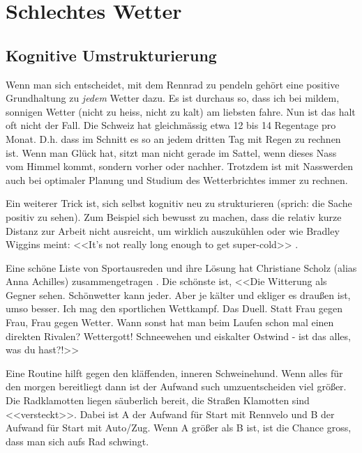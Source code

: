 \chapter{Schlechtes Wetter}


\section{Kognitive Umstrukturierung}

Wenn man sich entscheidet, mit dem Rennrad zu pendeln
gehört eine positive Grundhaltung zu \emph{jedem} Wetter dazu.
Es ist durchaus so, dass ich bei mildem, sonnigen Wetter
(nicht zu heiss, nicht zu kalt) am liebsten fahre.
Nun ist das halt oft nicht der Fall.
Die Schweiz hat gleichmässig etwa 12 bis 14 Regentage pro Monat.
D.h. dass im Schnitt es so an jedem dritten Tag mit Regen zu rechnen ist.
Wenn man Glück hat, sitzt man nicht gerade im Sattel,
wenn dieses Nass vom Himmel kommt, sondern vorher oder nachher.
Trotzdem ist mit Nasswerden auch bei optimaler Planung und Studium
des Wetterbrichtes immer zu rechnen.

Ein weiterer Trick ist, sich selbst kognitiv neu zu strukturieren
(sprich: die Sache positiv zu sehen).
Zum Beispiel sich bewusst zu machen, dass die relativ kurze Distanz zur Arbeit nicht ausreicht, 
um wirklich auszukühlen oder wie Bradley Wiggins meint:
<<It's not really long enough to get super-cold>> \cite{bbc2015wigginswinter}.

Eine schöne Liste von Sportausreden und ihre Lösung hat Christiane Scholz (alias Anna Achilles)
zusammengetragen \cite{Scholz2016Sportausreden}.
Die schönste ist, <<Die Witterung als Gegner sehen. Schönwetter kann jeder.
Aber je kälter und ekliger es draußen ist, umso besser.
Ich mag den sportlichen Wettkampf. Das Duell. Statt Frau gegen Frau,
Frau gegen Wetter. Wann sonst hat man beim Laufen schon mal einen direkten Rivalen?
Wettergott! Schneewehen und eiskalter Ostwind - ist das alles, was du hast?!>>

Eine Routine hilft gegen den kläffenden, inneren Schweinehund.
Wenn alles für den morgen bereitliegt dann ist der Aufwand such umzuentscheiden viel größer.
Die Radklamotten liegen säuberlich bereit, die Straßen Klamotten sind <<versteckt>>.
Dabei ist A der Aufwand für Start mit Rennvelo und B der Aufwand für Start mit Auto/Zug.
Wenn A größer als B ist, ist die Chance gross, dass man sich aufs Rad schwingt.

